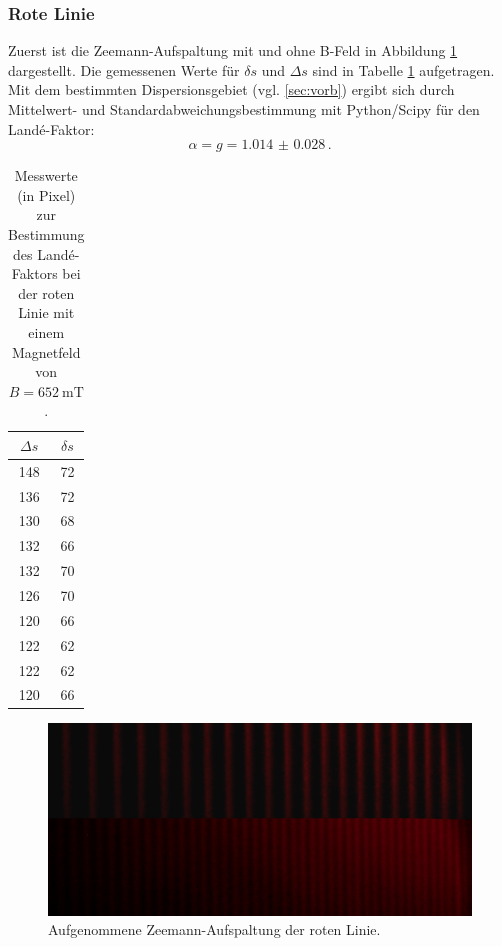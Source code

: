 \subsubsection{Rote Linie}
	Zuerst ist die Zeemann-Aufspaltung mit und ohne B-Feld in Abbildung \ref{fig:roterstern}
	dargestellt.
	Die gemessenen Werte für $\delta s$ und $\Delta s$ sind in Tabelle \ref{tab:rot}
	aufgetragen. Mit dem bestimmten Dispersionsgebiet (vgl. \ref{sec:vorb}) ergibt sich
	durch Mittelwert- und Standardabweichungsbestimmung mit Python/Scipy \cite{scipy} für
	den Landé-Faktor:
	\begin{equation*}
		\alpha= g = \SI{1.014(28)} \, \text{.}
	\end{equation*}
	\begin{table}
		\centering
		\caption{Messwerte (in Pixel) zur Bestimmung des Landé-Faktors bei der roten Linie mit einem Magnetfeld von $B = \SI{652}{\milli\tesla}$.}
		\label{tab:rot}
		\begin{tabular}{c | c}
			\toprule
			$\Delta s$ & $\delta s$\\
			\midrule
			148 & 72 \\
			136 & 72 \\
			130 & 68 \\
			132 & 66 \\
			132 & 70 \\
			126 & 70 \\
			120 & 66 \\
			122 & 62 \\
			122 & 62 \\
			120 & 66 \\
			\bottomrule
		\end{tabular}
	\end{table}
\begin{figure}
	\centering
	\includegraphics[width=\textwidth]{ouurs/red_cropped.png}
	\caption{Aufgenommene Zeemann-Aufspaltung der roten Linie.}
	\label{fig:roterstern}
\end{figure}

